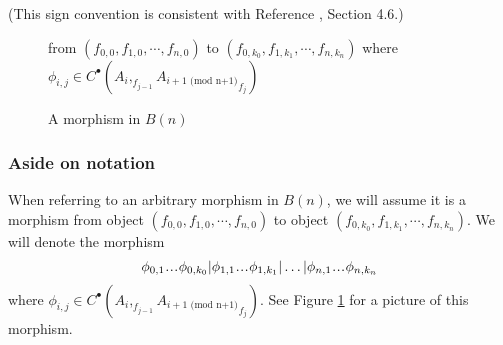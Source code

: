 (This sign convention is consistent with 
Reference \cite{T}, Section 4.6.)
%
\begin{figure}
\centerline{}
\caption{A morphism in $B(n)$}  \label{fig:phi}
from $(f_{0,0}, f_{1,0}, \cdots, f_{n,0})$ to  
$(f_{0,k_0}, f_{1,k_1}, \cdots, f_{n,k_n})$ where
$\phi_{i,j} \in C^\bullet(A_i, _{f_{j-1}}{A_{i+1 \textrm{ (mod n+1)}}}_{f_j})$
\end{figure}
%
\subsubsection{Aside on notation} \label{sec:phi_notation}
When referring to an arbitrary morphism in $B(n)$,
we will assume it is a morphism from object $(f_{0,0}, f_{1,0}, \cdots, f_{n,0})$ 
to object $(f_{0,k_0}, f_{1,k_1}, \cdots, f_{n,k_n})$.
We will denote the morphism 
$$\phi_{0,1}\smdots\phi_{0,k_0} | 
\phi_{1,1}\smdots\phi_{1,k_1} | \dots |
\phi_{n,1}\smdots\phi_{n,k_n}$$ 
where $\phi_{i,j} \in C^\bullet(A_i, _{f_{j-1}}
{A_{i+1 \textrm{ (mod n+1)}}}_{f_j})$. 
See Figure \ref{fig:phi} for a picture of 
this morphism.
%
